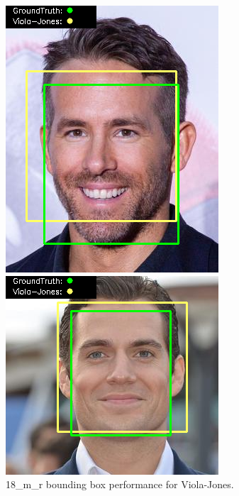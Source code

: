 \documentclass{l4proj}
\begin{document}
\begin{appendices}
\begin{figure}[h!]
  \centering
  \begin{minipage}{0.49\textwidth}
    \centering
     \includegraphics[width=\textwidth]{images/appendix/viola/18.png}
    \caption{18\_m\_r bounding box performance for Viola-Jones.}
    \label{whoopi_result}
  \end{minipage}
    \hfill
    \begin{minipage}{0.49\textwidth}
    \centering
     \includegraphics[width=\textwidth]{images/appendix/viola/19.png}

\end{minipage}
\end{figure}
\end{appendices}
\end{document}
